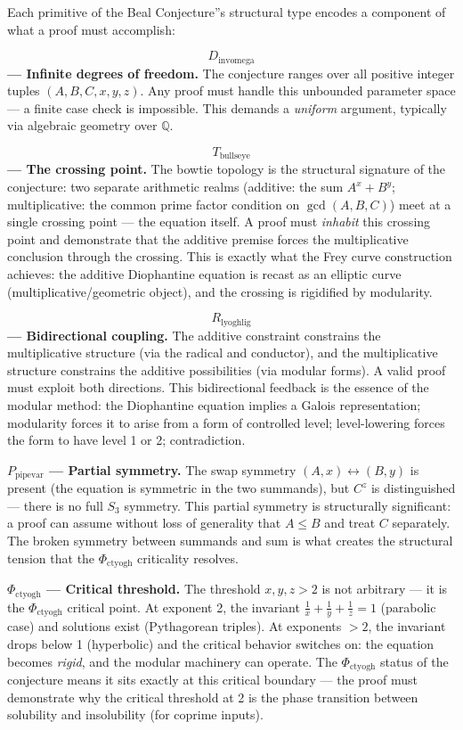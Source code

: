 \documentclass[12pt,a4paper]{article}
\begin{document}
Each primitive of the Beal Conjecture''s structural type encodes a component of what a proof must accomplish:

\textbf{$$D_{\text{invomega}}$$ --- Infinite degrees of freedom.} The conjecture ranges over all positive integer tuples $(A,B,C,x,y,z)$. Any proof must handle this unbounded parameter space --- a finite case check is impossible. This demands a \emph{uniform} argument, typically via algebraic geometry over $\mathbb{Q}$.

\textbf{$$T_{\text{bullseye}}$$ --- The crossing point.} The bowtie topology is the structural signature of the conjecture: two separate arithmetic realms (additive: the sum $A^x + B^y$; multiplicative: the common prime factor condition on $\gcd(A,B,C)$) meet at a single crossing point --- the equation itself. A proof must \emph{inhabit} this crossing point and demonstrate that the additive premise forces the multiplicative conclusion through the crossing. This is exactly what the Frey curve construction achieves: the additive Diophantine equation is recast as an elliptic curve (multiplicative/geometric object), and the crossing is rigidified by modularity.

\textbf{$$R_{\text{lyoghlig}}$$ --- Bidirectional coupling.} The additive constraint constrains the multiplicative structure (via the radical and conductor), and the multiplicative structure constrains the additive possibilities (via modular forms). A valid proof must exploit both directions. This bidirectional feedback is the essence of the modular method: the Diophantine equation implies a Galois representation; modularity forces it to arise from a form of controlled level; level-lowering forces the form to have level 1 or 2; contradiction.

\textbf{$P_{\text{pipevar}}$ --- Partial symmetry.} The swap symmetry $(A,x) \leftrightarrow (B,y)$ is present (the equation is symmetric in the two summands), but $C^z$ is distinguished --- there is no full $S_3$ symmetry. This partial symmetry is structurally significant: a proof can assume without loss of generality that $A \leq B$ and treat $C$ separately. The broken symmetry between summands and sum is what creates the structural tension that the $\Phi_{\text{ctyogh}}$ criticality resolves.

\textbf{$\Phi_{\text{ctyogh}}$ --- Critical threshold.} The threshold $x, y, z > 2$ is not arbitrary --- it is the $\Phi_{\text{ctyogh}}$ critical point. At exponent 2, the invariant $\frac{1}{x} + \frac{1}{y} + \frac{1}{z} = 1$ (parabolic case) and solutions exist (Pythagorean triples). At exponents $> 2$, the invariant drops below 1 (hyperbolic) and the critical behavior switches on: the equation becomes \emph{rigid}, and the modular machinery can operate. The $\Phi_{\text{ctyogh}}$ status of the conjecture means it sits exactly at this critical boundary --- the proof must demonstrate why the critical threshold at 2 is the phase transition between solubility and insolubility (for coprime inputs).
\end{document}
